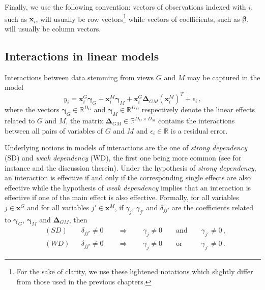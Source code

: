 \documentclass[]{book}
\let\rmarkdownfootnote\footnote%
\def\footnote{\protect\rmarkdownfootnote}
\begin{document}
Finally, we use the following convention: vectors of observations
indexed with \(i\), such as \(\mathbf{x}_i\), will usually be row vectors\footnote{For the sake of clarity, we use these lightened notations which
  slightly differ from those used in the previous chapters.} while
vectors of coefficients, such as \(\boldsymbol{\beta}\), will usually be column
vectors.

\hypertarget{interactions-in-linear-models}{%
\subsection{Interactions in linear models}\label{interactions-in-linear-models}}

Interactions between data stemming from views \(\mathit{G}\) and \(\mathit{M}\) may be
captured in the model \[\label{eq:classical_interaction_model}
  y_i =   \mathbf{x}^{\mathit{G}}_i \boldsymbol{\gamma}_{\mathit{G}}   
  + \mathbf{x}^{\mathit{M}}_i \boldsymbol{\gamma}_{\mathit{M}}  
  + \mathbf{x}^{\mathit{G}}_i \boldsymbol{\Delta}_{\mathit{G}\mathit{M}} (\mathbf{x}^{\mathit{M}}_i)^T  +
  \epsilon_i \,,\] where the vectors \(\boldsymbol{\gamma}_{\mathit{G}} \in \mathbb{R}^{D_{\mathit{G}}}\)
and \(\boldsymbol{\gamma}_{\mathit{M}} \in \mathbb{R}^{D_{\mathit{M}}}\) respectively denote the linear
effects related to \(\mathit{G}\) and \(\mathit{M}\), the matrix
\(\boldsymbol{\Delta}_{\mathit{G}\mathit{M}} \in \mathbb{R}^{D_{\mathit{G}} \times D_{\mathit{M}}}\) contains the
interactions between all pairs of variables of \(\mathit{G}\) and \(\mathit{M}\) and
\(\epsilon_i \in \mathbb{R}\) is a residual error.

Underlying notions in models of interactions are the one of \emph{strong dependency} (SD) and \emph{weak dependency} (WD), the first one being more common (see for instance \citep{bien2013lasso} and the discussion therein).
Under the hypothesis of \emph{strong dependency}, an interaction is effective
if and only if the corresponding single effects are also effective while
the hypothesis of \emph{weak dependency} implies that an interaction is
effective if one of the main effect is also effective. Formally, for all
variables \(j \in \mathbf{x}^{\mathit{G}}\) and for all variables \(j' \in \mathbf{x}^{\mathit{M}}\), if
\(\gamma_{j}\), \(\gamma_{j'}\) and \(\delta_{jj'}\) are the coefficients
related to \(\boldsymbol{\gamma}_{\mathit{G}}\), \(\boldsymbol{\gamma}_{\mathit{M}}\) and \(\boldsymbol{\Delta}_{\mathit{G}\mathit{M}}\), then
\[\begin{aligned}
  & (SD) &&  \delta_{jj'} \neq 0 \qquad \Rightarrow  \qquad
            \gamma_{j} 
            \neq 0 && \text{ and } && \gamma_{j'} \neq 0  \,, \\
  &  (WD) &&  \delta_{jj'} \neq 0 \qquad \Rightarrow  \qquad
             \gamma_{j} 
             \neq 0 && \text{ or } && \gamma_{j'} \neq 0  \,.\end{aligned}\]
\end{document}
